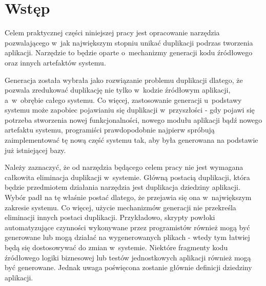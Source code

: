 \chapter{Wstęp} \label{chap:intro}

Celem praktycznej części niniejszej pracy jest opracowanie narzędzia pozwalającego w~jak największym stopniu unikać duplikacji podrzas tworzenia aplikacji.
Narzędzie to będzie oparte o~mechanizmy generacji kodu źródłowego oraz innych artefaktów systemu.

Generacja została wybrała jako rozwiązanie problemu duplikacji dlatego, że pozwala zredukować duplikację nie tylko w~kodzie źródłowym aplikacji, a~w~obrębie całego systemu.
Co więcej, zastosowanie generacji u~podstawy systemu może zapobiec pojawianiu się duplikacji w~przyszłości - gdy pojawi się potrzeba stworzenia nowej funkcjonalności, nowego modułu aplikacji bądź nowego artefaktu systemu, programiści prawdopodobnie najpierw spróbują zaimplementować tę nową część systemu tak, aby była generowana na podstawie już istniejącej bazy.

Należy zaznaczyć, że od narzędzia będącego celem pracy nie jest wymagana całkowita eliminacja duplikacji w~systemie.
Główną postacią duplikacji, która będzie przedmiotem działania narzędzia jest duplikacja dziedziny aplikacji.
Wybór padł na tę właśnie postać dlatego, że przejawia się ona w~największym zakresie systemu.
Co więcej, użycie mechanizmów generacji nie przekreśla eliminacji innych postaci duplikacji.
Przykładowo, skrypty powłoki automatyzujące czynności wykonywane przez programistów również mogą być generowane lub mogą działać na wygenerowanych plikach - wtedy tym łatwiej będą się dostosowywać do zmian w~systemie.
Niektóre fragmenty kodu źródłowego logiki biznesowej lub testów jednostkowych aplikacji również mogą być generowane.
Jednak uwaga poświęcona zostanie głównie definicji dziedziny aplikacji.
